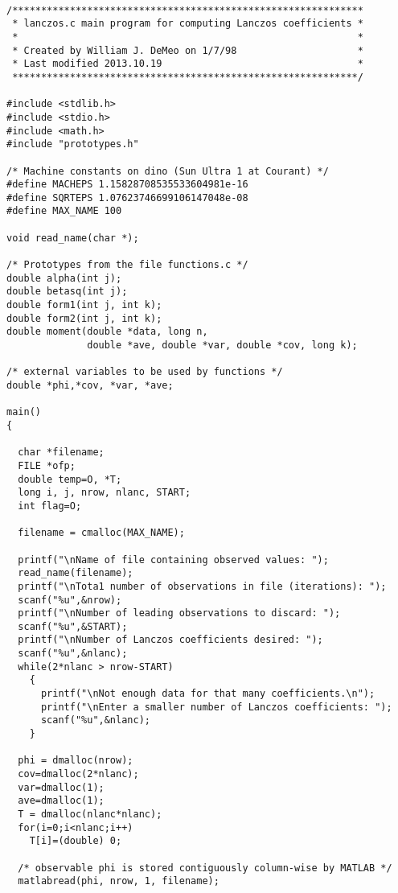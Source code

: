 \documentclass[12pt,letterpaper]{report}
\theoremstyle{plain}
\theoremstyle{definition}
\theoremstyle{remark}
\numberwithin{theorem}{chapter}
\numberwithin{claim}{chapter}
\numberwithin{equation}{chapter}
\numberwithin{conjecture}{chapter}
\newcommand\<{\ensuremath{\langle}}
\renewcommand\>{\ensuremath{\rangle}}
\begin{document}
\vskip2cm



{\small 
\begin{verbatim}




/*************************************************************
 * lanczos.c main program for computing Lanczos coefficients *
 *                                                           *
 * Created by William J. DeMeo on 1/7/98                     *
 * Last modified 2013.10.19                                  *
 ************************************************************/

#include <stdlib.h>
#include <stdio.h>
#include <math.h>
#include "prototypes.h"

/* Machine constants on dino (Sun Ultra 1 at Courant) */
#define MACHEPS 1.15828708535533604981e-16
#define SQRTEPS 1.07623746699106147048e-08
#define MAX_NAME 100

void read_name(char *);

/* Prototypes from the file functions.c */
double alpha(int j);
double betasq(int j);
double form1(int j, int k);
double form2(int j, int k);
double moment(double *data, long n, 
              double *ave, double *var, double *cov, long k);

/* external variables to be used by functions */
double *phi,*cov, *var, *ave;

main()
{

  char *filename;
  FILE *ofp;
  double temp=O, *T;
  long i, j, nrow, nlanc, START;
  int flag=O;

  filename = cmalloc(MAX_NAME);

  printf("\nName of file containing observed values: ");
  read_name(filename);
  printf("\nTota1 number of observations in file (iterations): ");
  scanf("%u",&nrow);
  printf("\nNumber of leading observations to discard: ");
  scanf("%u",&START);
  printf("\nNumber of Lanczos coefficients desired: ");
  scanf("%u",&nlanc);
  while(2*nlanc > nrow-START)
    {
      printf("\nNot enough data for that many coefficients.\n");
      printf("\nEnter a smaller number of Lanczos coefficients: ");
      scanf("%u",&nlanc);
    }

  phi = dmalloc(nrow);
  cov=dmalloc(2*nlanc);
  var=dmalloc(1);
  ave=dmalloc(1);
  T = dmalloc(nlanc*nlanc); 
  for(i=0;i<nlanc;i++) 
    T[i]=(double) 0;

  /* observable phi is stored contiguously column-wise by MATLAB */
  matlabread(phi, nrow, 1, filename);


\end{verbatim}}
\end{document}
